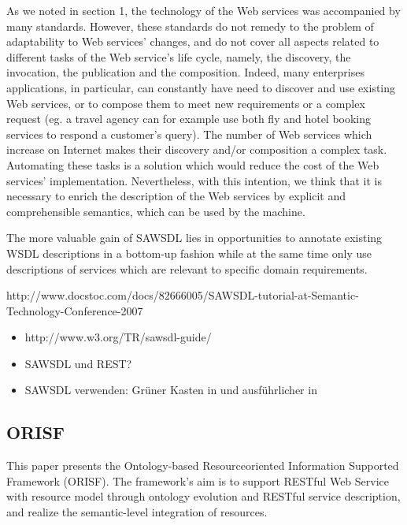 As we noted in section 1, the technology of the Web
services was accompanied by many standards. However,
these standards do not remedy to the problem of adaptability
to Web services’ changes, and do not cover all aspects related
to different tasks of the Web service’s life cycle, namely, the
discovery, the invocation, the publication and the
composition. Indeed, many enterprises applications, in
particular, can constantly have need to discover and use
existing Web services, or to compose them to meet new
requirements or a complex request (eg. a travel agency can
for example use both fly and hotel booking services to
respond a customer’s query). The number of Web services
which increase on Internet makes their discovery and/or
composition a complex task. Automating these tasks is a
solution which would reduce the cost of the Web services’
implementation. Nevertheless, with this intention, we think
that it is necessary to enrich the description of the Web
services by explicit and comprehensible semantics, which can
be used by the machine. \cite{ei-sawsdl}

The more valuable
gain of SAWSDL lies in opportunities to annotate existing
WSDL descriptions in a bottom-up fashion while at the
same time only use descriptions of services which are relevant
to specific domain requirements. \cite{WSMOLITE}

http://www.docstoc.com/docs/82666005/SAWSDL-tutorial-at-Semantic-Technology-Conference-2007

\begin{itemize}
\item http://www.w3.org/TR/sawsdl-guide/
\item \ac{SAWSDL} und \ac{REST}? \cite{xn-sss}
\item \ac{SAWSDL} verwenden: Grüner Kasten in \cite[S.63]{ky-sawsdl} und ausführlicher in \cite{vr-sesa}
\end{itemize}

\subsection{ORISF}

This paper presents the Ontology-based Resourceoriented
Information Supported Framework (ORISF). The
framework’s aim is to support RESTful Web Service with
resource model through ontology evolution and RESTful
service description, and realize the semantic-level
integration of resources. \cite{zg-ontorest}
